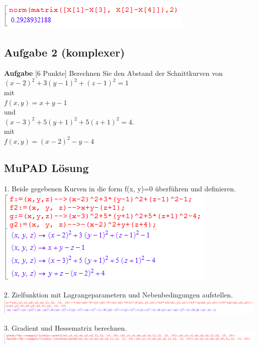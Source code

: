 \documentclass[11pt,final]{scrreprt}
\newcommand{\br} {\medskip\\}
\newcommand{\gbr} {\bigskip\\}
\begin{document}
\includegraphics[scale=2.2]{images/abstandsproblem2/abstand.png}

\subsection{Aufgabe 2 (komplexer)}

\textbf{Aufgabe} [6 Punkte] Berechnen Sie den Abstand der Schnittkurven von\br
$(x-2)^2+3(y-1)^2+(z-1)^2=1$\\ mit\\
$f(x, y)=x+y-1$\gbr
und\gbr
$(x-3)^2+5(y+1)^2+5(z+1)^2=4$.\\ mit\\
$f(x,y)=(x-2)^2-y-4$\\

\subsection{MuPAD Lösung}

1. Beide gegebenen Kurven in die form f(x, y)=0 überführen und definieren.\\

\includegraphics[scale=2.2]{images/abstandsproblem3/param.png}

2. Zielfunktion mit Lagrangeparametern und Nebenbedingungen aufstellen.\\

\includegraphics[width=15cm]{images/abstandsproblem3/zielfkt.png}

3. Gradient und Hessematrix berechnen.\\

\includegraphics[width=15cm]{images/abstandsproblem3/grad.png}
\end{document}
